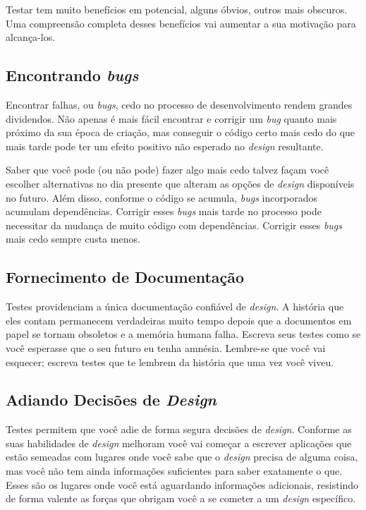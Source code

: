Testar tem muito benefícios em potencial, alguns óbvios, outros mais obscuros. Uma compreensão completa desses benefícios vai aumentar a sua motivação para alcança-los.

\subsection{Encontrando \textit{bugs}}

Encontrar falhas, ou \textit{bugs}, cedo no processo de desenvolvimento rendem grandes dividendos. Não apenas é mais fácil encontrar e corrigir um \textit{bug} quanto mais próximo da sua época de criação, mas conseguir o código certo mais cedo do que mais tarde pode ter um efeito positivo não esperado no \textit{design} resultante.

Saber que você pode (ou não pode) fazer algo mais cedo talvez façam você escolher alternativas no dia presente que alteram as opções de \textit{design} disponíveis no futuro. Além disso, conforme o código se acumula, \textit{bugs} incorporados acumulam dependências. Corrigir esses \textit{bugs} mais tarde no processo pode necessitar da mudança de muito código com dependências. Corrigir esses \textit{bugs} mais cedo sempre custa menos.

\subsection{Fornecimento de Documentação}

Testes providenciam a única documentação confiável de \textit{design}. A história que eles contam permanecem verdadeiras muito tempo depois que a documentos em papel se tornam obsoletos e a memória humana falha. Escreva seus testes como se você esperasse que o seu futuro eu tenha amnésia. Lembre-se que você vai esquecer; escreva testes que te lembrem da história que uma vez você viveu. 

\subsection{Adiando Decisões de \textit{Design}}

Testes permitem que você adie de forma segura decisões de \textit{design}. Conforme as suas habilidades de \textit{design} melhoram você vai começar a escrever aplicações que estão semeadas com lugares onde você sabe que o \textit{design} precisa de alguma coisa, mas você não tem ainda informações suficientes para saber exatamente o que. Esses são os lugares onde você está aguardando informações adicionais, resistindo de forma valente as forças que obrigam você a se cometer a um \textit{design} específico.

